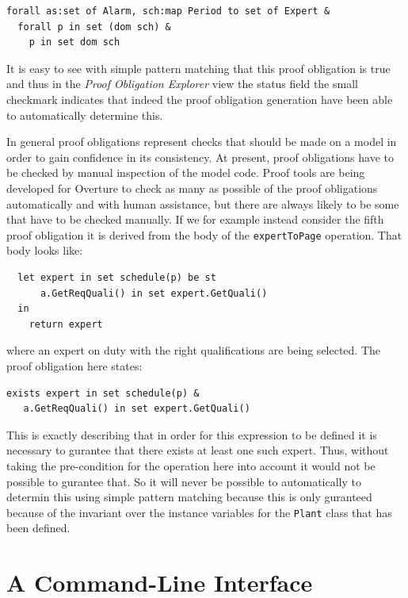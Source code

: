 \begin{lstlisting}
forall as:set of Alarm, sch:map Period to set of Expert &
  forall p in set (dom sch) &
    p in set dom sch
\end{lstlisting}
It is easy to see with simple pattern matching that this proof
obligation is true and thus in the \emph{Proof Obligation Explorer}
view the status field the small checkmark indicates that indeed the
proof obligation generation have been able to automatically determine
this.

In general proof obligations represent checks that should be made on a
model in order to gain confidence in its consistency. At present,
proof obligations have to be checked by manual inspection of the model
code. Proof tools are being developed for Overture to check as many as
possible of the proof obligations automatically and with human
assistance, but there are always likely to be some that have to be
checked manually. If we for example instead consider the fifth proof
obligation it is derived from the body of the \texttt{expertToPage}
operation. That body looks like:

\begin{lstlisting}
  let expert in set schedule(p) be st
      a.GetReqQuali() in set expert.GetQuali()
  in
    return expert
\end{lstlisting}

\noindent where an expert on duty with the right qualifications are
being selected. The proof obligation here states:

\begin{lstlisting}
exists expert in set schedule(p) &
   a.GetReqQuali() in set expert.GetQuali()
\end{lstlisting}

\noindent This is exactly describing that in order for this expression
to be defined it is necessary to gurantee that there exists at least
one such expert. Thus, without taking the pre-condition for the
operation here into account it would not be possible to gurantee
that. So it will never be possible to automatically to determin this
using simple pattern matching because this is only guranteed because
of the invariant over the instance variables for the \texttt{Plant}
class that has been defined.

\section{A Command-Line Interface}\label{sec:cmdline}

